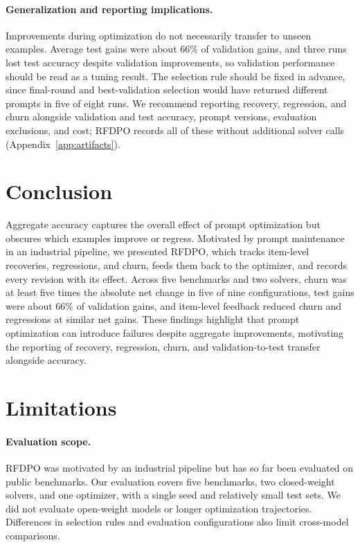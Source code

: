 \documentclass[11pt]{article}
\begin{document}
\paragraph{Generalization and reporting implications.}
Improvements during optimization do not necessarily transfer to unseen examples. Average test gains were about 66\% of validation gains, and three runs lost test accuracy despite validation improvements, so validation performance should be read as a tuning result. The selection rule should be fixed in advance, since final-round and best-validation selection would have returned different prompts in five of eight runs. We recommend reporting recovery, regression, and churn alongside validation and test accuracy, prompt versions, evaluation exclusions, and cost; RFDPO records all of these without additional solver calls (Appendix~\ref{app:artifacts}).

\section{Conclusion}
Aggregate accuracy captures the overall effect of prompt optimization but obscures which examples improve or regress. Motivated by prompt maintenance in an industrial pipeline, we presented RFDPO, which tracks item-level recoveries, regressions, and churn, feeds them back to the optimizer, and records every revision with its effect. Across five benchmarks and two solvers, churn was at least five times the absolute net change in five of nine configurations, test gains were about 66\% of validation gains, and item-level feedback reduced churn and regressions at similar net gains. These findings highlight that prompt optimization can introduce failures despite aggregate improvements, motivating the reporting of recovery, regression, churn, and validation-to-test transfer alongside accuracy.

\section*{Limitations}
\label{sec:limitations}

\paragraph{Evaluation scope.}
RFDPO was motivated by an industrial pipeline but has so far been evaluated on public benchmarks. Our evaluation covers five benchmarks, two closed-weight solvers, and one optimizer, with a single seed and relatively small test sets. We did not evaluate open-weight models or longer optimization trajectories. Differences in selection rules and evaluation configurations also limit cross-model comparisons.
\end{document}
